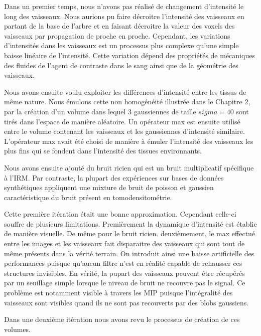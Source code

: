 Dans un premier temps, nous n'avons pas réalisé de changement d'intensité le long des vaisseaux. Nous aurions pu faire décroitre l'intensité des vaisseaux en partant de la base de l'arbre et en faisant décroitre la valeur des voxels des vaisseaux par propagation de proche en proche. Cependant, les variations d'intensités dans les vaisseaux est un processus plus complexe qu'une simple baisse linéaire de l'intensité. Cette variation dépend des propriétés de mécaniques des fluides de l'agent de contraste dans le sang ainsi que de la géométrie des vaisseaux.


Nous avons ensuite voulu exploiter les différences d'intensité entre les tissus de même nature. Nous émulons cette non homogénéité illustrée dans le Chapitre 2, par la création d'un volume dans lequel 3 gaussiennes de taille $sigma=40$ sont tirés dans l'espace de manière aléatoire. Un opérateur max est ensuite utilisé entre le volume contenant les vaisseaux et les gaussiennes d'intensité similaire. L'opérateur max avait été choisi de manière à émuler l'intensité des vaisseaux les plus fins qui se fondent dans l'intensité des tissues environnants.


Nous avons ensuite ajouté du bruit ricien qui est un bruit multiplicatif spécifique à l'IRM. Par contraste, la plupart des expériences sur bases de données synthétiques appliquent une mixture de bruit de poisson et gaussien caractéristique du bruit présent en tomodensitométrie.

Cette première itération était une bonne approximation. Cependant celle-ci souffre de plusieurs limitations. Premièrement la dynamique d'intensité est établie de manière visuelle. De même pour le bruit ricien. deuxièmement, le max effectué entre les images et les vaisseaux fait disparaitre des vaisseaux qui sont tout de même présents dans la vérité terrain. On introduit ainsi une baisse artificielle des performances puisque qu'aucun filtre n'est en réalité capable de rehausser ces structures invisibles. En vérité, la pupart des vaisseaux peuvent être récupérés par un seuillage simple lorsque le niveau de bruit ne recouvre pas le signal. Ce problème est notamment visible à travers les MIP puisque l'intégralité des vaisseaux sont visibles quand ils ne sont pas recouverts par des blobs gaussiens.

Dans une deuxième itération nous avons revu le processus de création de ces volumes.

